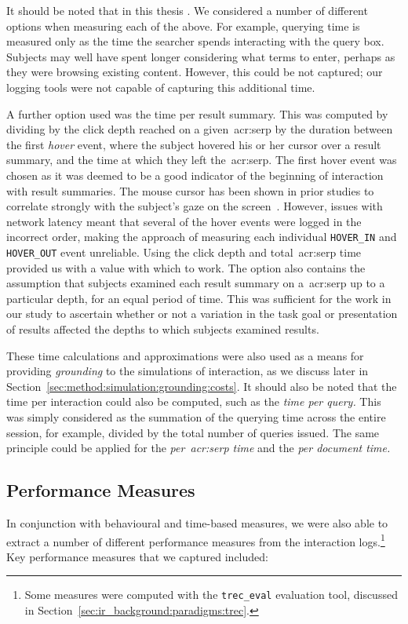 It should be noted that in this thesis . We considered a number of different options when measuring each of the above. For example, querying time is measured only as the time the searcher spends interacting with the query box. Subjects may well have spent longer considering what terms to enter, perhaps as they were browsing existing content. However, this could be not captured; our logging tools were not capable of capturing this additional time.

A further option used was the time per result summary. This was computed by dividing by the click depth reached on a given~\gls{acr:serp} by the duration between the first \emph{hover} event, where the subject hovered his or her cursor over a result summary, and the time at which they left the~\gls{acr:serp}. The first hover event was chosen as it was deemed to be a good indicator of the beginning of interaction with result summaries. The mouse cursor has been shown in prior studies to correlate strongly with the subject's gaze on the screen~\citep{chen2001mouse_cursor, smucker2014judging_relevance_movements}. However, issues with network latency meant that several of the hover events were logged in the incorrect order, making the approach of measuring each individual \texttt{HOVER\_IN} and \texttt{HOVER\_OUT} event unreliable. Using the click depth and total~\gls{acr:serp} time provided us with a value with which to work. The option also contains the assumption that subjects examined each result summary on a~\gls{acr:serp} up to a particular depth, for an equal period of time. This was sufficient for the work in our study to ascertain whether or not a variation in the task goal or presentation of results affected the depths to which subjects examined results.

These time calculations and approximations were also used as a means for providing \emph{grounding} to the simulations of interaction, as we discuss later in Section~\ref{sec:method:simulation:grounding:costs}. It should also be noted that the time per interaction could also be computed, such as the \emph{time per query.} This was simply considered as the summation of the querying time across the entire session, for example, divided by the total number of queries issued. The same principle could be applied for the \emph{per~\gls{acr:serp} time} and the \emph{per document time.}

\subsection{Performance Measures}\label{sec:methodology:extracting:performance}
In conjunction with behavioural and time-based measures, we were also able to extract a number of different performance measures from the interaction logs.\footnote{Some measures were computed with the \texttt{trec\_eval} evaluation tool, discussed in Section~\ref{sec:ir_background:paradigms:trec}.} Key performance measures that we captured included:

